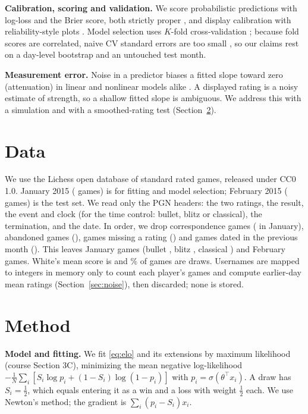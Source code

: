 \documentclass{article}
\begin{document}
\textbf{Calibration, scoring and validation.} We score probabilistic predictions with log-loss and the Brier score, both strictly proper \citep{brier1950,gneiting2007}, and display calibration with reliability-style plots \citep{guo2017}. Model selection uses $K$-fold cross-validation \citep{hastie2009}; because fold scores are correlated, naive CV standard errors are too small \citep{bates2024}, so our claims rest on a day-level bootstrap \citep{efron1993} and an untouched test month.

\textbf{Measurement error.} Noise in a predictor biases a fitted slope toward zero (attenuation) in linear and nonlinear models alike \citep{carroll2006}. A displayed rating is a noisy estimate of strength, so a shallow fitted slope is ambiguous. We address this with a simulation and with a smoothed-rating test (Section~\ref{sec:method}).

\section{Data}
\label{sec:data}

We use the Lichess open database \citep{lichessdb} of standard rated games, released under CC0 1.0. January 2015 (\gamesJan{} games) is for fitting and model selection; February 2015 (\gamesFeb{} games) is the test set. We read only the PGN headers: the two ratings, the result, the event and clock (for the time control: bullet, blitz or classical), the termination, and the date. In order, we drop correspondence games (\rmJanCorrespondence{} in January), abandoned games (\rmJanAbandoned), games missing a rating (\rmJanMissingRating) and games dated in the previous month (\rmJanWrongMonthOrBadDate). This leaves \keptJan{} January games (bullet \nJanBullet, blitz \nJanBlitz, classical \nJanClassical) and \keptFeb{} February games. White's mean score is \meanScoreJan{} and \drawPctJan\% of games are draws. Usernames are mapped to integers in memory only to count each player's games and compute earlier-day mean ratings (Section~\ref{sec:noise}), then discarded; none is stored.

\section{Method}
\label{sec:method}

\textbf{Model and fitting.} We fit \eqref{eq:elo} and its extensions by maximum likelihood (course Section 3C), minimizing the mean negative log-likelihood
$-\tfrac1N\sum_i [S_i \log p_i + (1 - S_i)\log(1 - p_i)]$ with $p_i = \sigma(\theta^\top x_i)$. A draw has $S_i = \tfrac12$, which equals entering it as a win and a loss with weight $\tfrac12$ each. We use Newton's method; the gradient is $\sum_i (p_i - S_i)x_i$.
\end{document}
